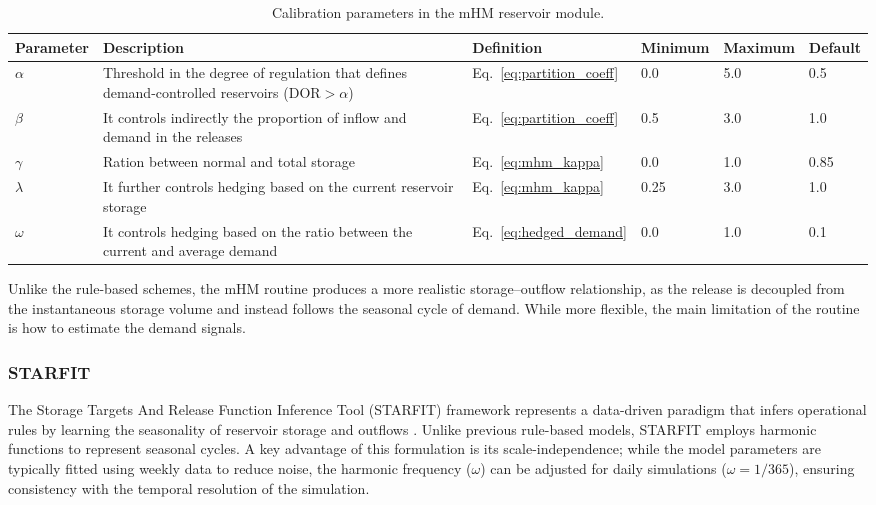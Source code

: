\documentclass[hess, manuscript]{copernicus}
\begin{document}
\begin{table}[t]
    \centering
    \caption{Calibration parameters in the mHM reservoir module.}
    \begin{tabularx}{\textwidth}{lXllll}
        \toprule
       \textbf{Parameter} & \textbf{Description} & \textbf{Definition} & \textbf{Minimum} & \textbf{Maximum} & \textbf{Default} \\
        \midrule
        $\alpha$ & Threshold in the degree of regulation that defines demand-controlled reservoirs ($\text{DOR} > \alpha$) & Eq.~\ref{eq:partition_coeff} & 0.0 & 5.0 & 0.5 \\
        $\beta$ & It controls indirectly the proportion of inflow and demand in the releases & Eq.~\ref{eq:partition_coeff} & 0.5 & 3.0 & 1.0 \\
        $\gamma$ & Ration between normal and total storage & Eq.~\ref{eq:mhm_kappa} & 0.0 & 1.0 & 0.85 \\
        $\lambda$ & It further controls hedging based on the current reservoir storage & Eq.~\ref{eq:mhm_kappa} & 0.25 & 3.0 & 1.0 \\
        $\omega$ & It controls hedging based on the ratio between the current and average demand & Eq.~\ref{eq:hedged_demand} & 0.0 & 1.0 & 0.1 \\
         \bottomrule
    \end{tabularx}
    \label{tab:parameters_mhm}
\end{table}

Unlike the rule-based schemes, the mHM routine produces a more realistic storage–outflow relationship, as the release is decoupled from the instantaneous storage volume and instead follows the seasonal cycle of demand. While more flexible, the main limitation of the routine is how to estimate the demand signals.

\subsubsection{STARFIT}
\label{sec:starfit}

The Storage Targets And Release Function Inference Tool (STARFIT) framework represents a data-driven paradigm that infers operational rules by learning the seasonality of reservoir storage and outflows \citep{Turner2021}. Unlike previous rule-based models, STARFIT employs harmonic functions to represent seasonal cycles. A key advantage of this formulation is its scale-independence; while the model parameters are typically fitted using weekly data to reduce noise, the harmonic frequency ($\omega$) can be adjusted for daily simulations ($\omega=1/365$), ensuring consistency with the temporal resolution of the simulation.
\end{document}
